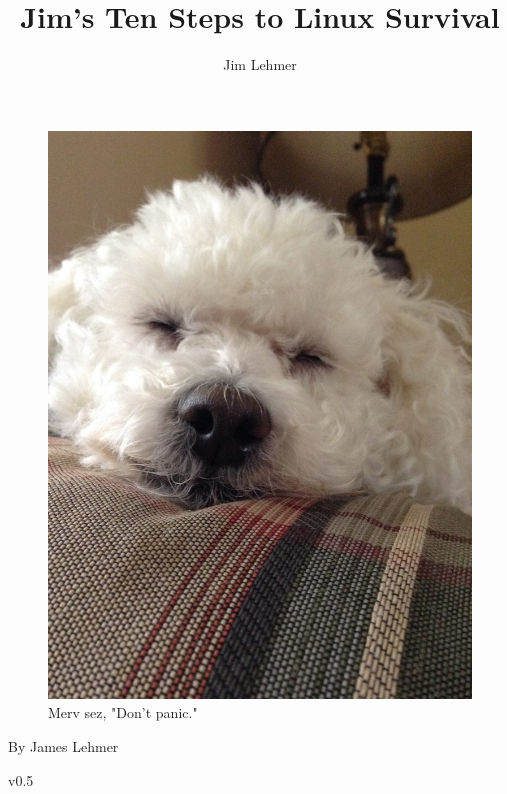 \documentclass[10pt,]{book}
\title{Jim's Ten Steps to Linux Survival}
\author{Jim Lehmer}
\date{}
\numberwithin{figure}{chapter}
\begin{document}
\maketitle

{
\hypersetup{linkcolor=black}
\setcounter{tocdepth}{3}
\tableofcontents
}

{
\listoffigures
}

\ifxetex
\section*{} \pagestyle{empty}

\begin{figure}[!htbp]
\includegraphics{./images/Merv.jpg}
\caption*{Merv sez, "Don't panic."}
\end{figure}

\cleardoublepage
By James Lehmer \par
v0.5 \par
\end{document}
